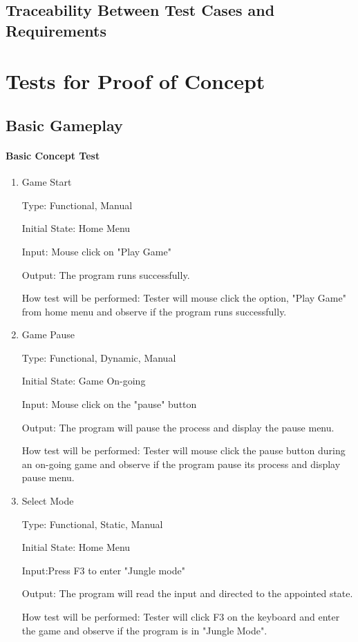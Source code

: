 \documentclass[12pt, titlepage]{article}
\begin{document}
\subsection{Traceability Between Test Cases and Requirements}

\section{Tests for Proof of Concept}

\subsection{Basic Gameplay}
		
\paragraph{Basic Concept Test}

\begin{enumerate}

\item{Game Start\\}

Type: Functional, Manual
					
Initial State: Home Menu
					
Input: Mouse click on "Play Game"
					
Output: The program runs successfully.
					
How test will be performed: Tester will mouse click the option, "Play Game" from home menu and observe if the program runs successfully.
					
\item{Game Pause\\}

Type: Functional, Dynamic, Manual
					
Initial State: Game On-going
					
Input: Mouse click on the "pause" button
					
Output: The program will pause the process and display the pause menu.
					
How test will be performed: Tester will mouse click the pause button during an on-going game and observe if the program pause its process and display pause menu.

\item{Select Mode\\}

Type: Functional, Static, Manual
					
Initial State: Home Menu
					
Input:Press F3 to enter "Jungle mode"
					
Output: The program will read the input and directed to the appointed state.
					
How test will be performed: Tester will click F3 on the keyboard and enter the game and observe if the program is in "Jungle Mode".



\end{enumerate}
\end{document}
